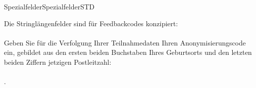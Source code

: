 \begin{MXContent}{Spezialfelder}{Spezialfelder}{STD}
\begin{MExample}
Die Stringlängenfelder sind für Feedbackcodes konzipiert:
\ \\ \ \\
Geben Sie für die Verfolgung Ihrer Teilnahmedaten Ihren Anonymisierungscode ein, gebildet aus den ersten beiden Buchstaben Ihres Geburtsorts
und den letzten beiden Ziffern jetzigen Postleitzahl:
\ \\ \ \\
.
\end{MExample}

\end{MXContent}




